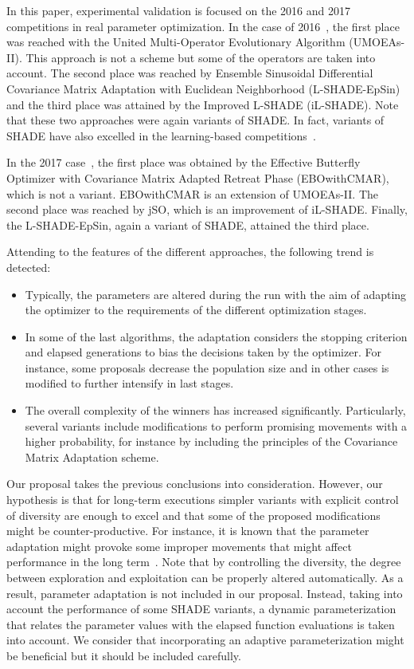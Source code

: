 In this paper, experimental validation is focused on the \CEC{} 2016 and \CEC{} 2017 competitions in real parameter optimization.
%
In the case of 2016~\cite{CEC2015}, the first place was reached with the United Multi-Operator Evolutionary Algorithm (UMOEAs-II).
%
This approach is not a \DE{} scheme but some of the \DE{} operators are taken into account.
%
The second place was reached by Ensemble Sinusoidal Differential Covariance Matrix Adaptation with Euclidean Neighborhood (L-SHADE-EpSin) 
and the third place was attained by the Improved L-SHADE (iL-SHADE).
%
Note that these two approaches were again variants of SHADE.
%
In fact, variants of SHADE have also excelled in the learning-based competitions~\cite{CEC2016_learn}.

In the \CEC{} 2017 case~\cite{CEC2017}, the first place was obtained by the Effective Butterfly Optimizer with Covariance 
Matrix Adapted Retreat Phase (EBOwithCMAR), which is not a \DE{} variant.
%
EBOwithCMAR is an extension of UMOEAs-II.
%
The second place was reached by jSO, which is an improvement of iL-SHADE.
%
Finally, the L-SHADE-EpSin, again a variant of SHADE, attained the third place.

Attending to the features of the different approaches, the following trend is detected:

\begin{itemize}
	\item Typically, the parameters are altered during the run with the aim of adapting the optimizer to the requirements of the different optimization stages. 
	\item In some of the last algorithms, the adaptation considers the stopping criterion and elapsed generations to bias the decisions taken by the optimizer.
	For instance, some proposals decrease the population size and in other cases \DE{} is modified to further intensify in last stages.
	\item The overall complexity of the winners has increased significantly. Particularly, several variants include modifications to perform promising
	movements with a higher probability, for instance by including the principles of the Covariance Matrix Adaptation scheme.
\end{itemize}

Our proposal takes the previous conclusions into consideration.
%
However, our hypothesis is that for long-term executions simpler variants with explicit control of diversity are enough to excel and 
that some of the proposed modifications might be counter-productive.
%
For instance, it is known that the parameter adaptation might provoke some improper movements that might affect performance in the
long term~\cite{montgomery2010analysis}.
%
Note that by controlling the diversity, the degree between exploration and exploitation can be properly altered automatically.
%
As a result, parameter adaptation is not included in our proposal.
%
Instead, taking into account the performance of some SHADE variants, a dynamic parameterization that relates the parameter values with 
the elapsed function evaluations is taken into account.
%
We consider that incorporating an adaptive parameterization might be beneficial but it should be included carefully.


